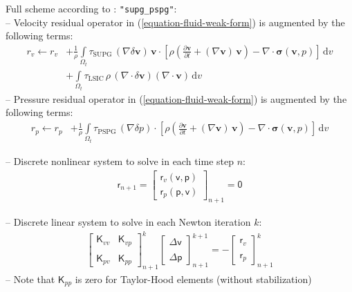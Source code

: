 \documentclass[a4paper,12pt]{report}
\newcommand{\bs}[1]{\boldsymbol{#1}}
\newcommand{\Om}{\mathit{\Omega}}
\newcommand{\ROP}{\bs{\mathsf{r}}}
\begin{document}
Full scheme according to \cite{tezduyar2000}: \verb."supg_pspg".:\\
-- Velocity residual operator in (\ref{equation-fluid-weak-form}) is augmented by the following terms:
\begin{equation}
\begin{aligned}
r_v \leftarrow r_v &+ \frac{1}{\rho}\int\limits_{\Om_t} \tau_{\mathrm{SUPG}}\,(\nabla\delta\bs{v})\,\bs{v} \cdot \left[\rho\left(\frac{\partial \bs{v}}{\partial t} + (\nabla\bs{v})\,\bs{v}\right) - \nabla \cdot \bs{\sigma}(\bs{v},p)\right]\,\mathrm{d}v \\
& + \int\limits_{\Om_t} \tau_{\mathrm{LSIC}}\,\rho\,(\nabla\cdot\delta\bs{v})(\nabla\cdot\bs{v})\,\mathrm{d}v
\end{aligned}
\end{equation}
-- Pressure residual operator in (\ref{equation-fluid-weak-form}) is augmented by the following terms:
\begin{equation}
\begin{aligned}
r_p \leftarrow r_p &+ \frac{1}{\rho}\int\limits_{\Om_t} \tau_{\mathrm{PSPG}}\,(\nabla\delta p) \cdot \left[\rho\left(\frac{\partial \bs{v}}{\partial t} + (\nabla\bs{v})\,\bs{v}\right) - \nabla \cdot \bs{\sigma}(\bs{v},p)\right]\,\mathrm{d}v 
\end{aligned}
\end{equation}

-- Discrete nonlinear system to solve in each time step $n$:
\begin{equation}
\label{equation-nonlin-sys-fluid}
\begin{aligned}
\ROP_{n+1} = \begin{bmatrix} \ROP_{v}(\bs{\mathsf{v}},\bs{\mathsf{p}}) \\ \ROP_{p}(\bs{\mathsf{p}},\bs{\mathsf{v}}) \end{bmatrix}_{n+1} = \bs{\mathsf{0}}
\end{aligned}
\end{equation}

-- Discrete linear system to solve in each Newton iteration $k$:
\begin{equation}
\label{equation-lin-sys-fluid}
\begin{aligned}
\begin{bmatrix} \bs{\mathsf{K}}_{vv} & \bs{\mathsf{K}}_{vp} \\ \\ \bs{\mathsf{K}}_{pv} & \bs{\mathsf{K}}_{pp} \end{bmatrix}_{n+1}^{k}\begin{bmatrix} \Delta\bs{\mathsf{v}} \\ \\ \Delta\bs{\mathsf{p}} \end{bmatrix}_{n+1}^{k+1}=-\begin{bmatrix} \ROP_{v} \\ \\ \ROP_{p} \end{bmatrix}_{n+1}^{k}
\end{aligned}
\end{equation}
-- Note that $\bs{\mathsf{K}}_{pp}$ is zero for Taylor-Hood elements (without stabilization)
\end{document}
